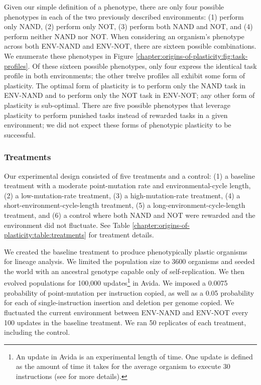 Given our simple definition of a phenotype, there are only four possible phenotypes in each of the two previously described environments: 
(1) perform only NAND, 
(2) perform only NOT, 
(3) perform both NAND and NOT, 
and (4) perform neither NAND nor NOT. 
When considering an organism's phenotype across both ENV-NAND and ENV-NOT, there are sixteen possible combinations. 
We enumerate these phenotypes in Figure \ref{chapter:origins-of-plasticity:fig:task-profiles}. 
Of these sixteen possible phenotypes, only four express the identical task profile in both environments; the other twelve profiles all exhibit some form of plasticity. 
The optimal form of plasticity is to perform only the NAND task in ENV-NAND and to perform only the NOT task in ENV-NOT; any other form of plasticity is sub-optimal. 
There are five possible phenotypes that leverage plasticity to perform punished tasks instead of rewarded tasks in a given environment; we did not expect these forms of phenotypic plasticity to be successful. 



\subsubsection{Treatments}
\label{chapter:origins-of-plasticity:sec:methods:experimental-design:treatments}

Our experimental design consisted of five treatments and a control: 
(1) a baseline treatment with a moderate point-mutation rate and environmental-cycle length, 
(2) a low-mutation-rate treatment, 
(3) a high-mutation-rate treatment, 
(4) a short-environment-cycle-length treatment, 
(5) a long-environment-cycle-length treatment, 
and (6) a control where both NAND and NOT were rewarded and the environment did not fluctuate. 
See Table \ref{chapter:origins-of-plasticity:table:treatments} for treatment details.

We created the baseline treatment to produce phenotypically plastic organisms for lineage analysis. 
We limited the population size to 3600 organisms and seeded the world with an ancestral genotype capable only of self-replication.
We then evolved populations for 100,000 updates\footnote{
An update in Avida is an experimental length of time. One update is defined as the amount of time it takes for the average organism to execute 30 instructions (see \citep{ofria_avida:_2009} for more details).
} in Avida. 
We imposed a 0.0075 probability of point-mutation per instruction copied, as well as a 0.05 probability for each of single-instruction insertion and deletion per genome copied. 
We fluctuated the current environment between ENV-NAND and ENV-NOT every 100 updates in the baseline treatment. 
We ran 50 replicates of each treatment, including the control. 

